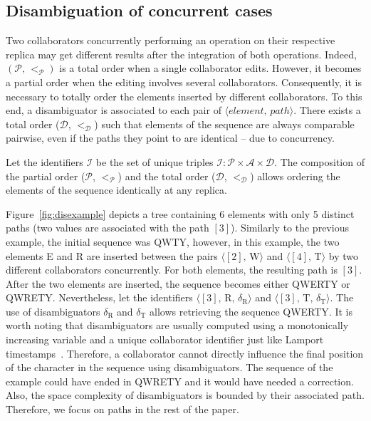 \subsection{Disambiguation of concurrent cases}
\label{subsec:disambiguation}

Two collaborators concurrently performing an operation on their respective
replica may get different results after the integration of both
operations. Indeed, $(\mathcal{P},\,<_\mathcal{P})$ is a total order when a
single collaborator edits. However, it becomes a partial order when the editing
involves several collaborators. Consequently, it is necessary to totally order
the elements inserted by different collaborators. To this end, a disambiguator
is associated to each pair of $\langle element,\,path\rangle$.  There exists a
total order ($\mathcal{D}$, $<_{\mathcal{D}}$) such that elements of the
sequence are always comparable pairwise, even if the paths they point to are
identical -- due to concurrency.

Let the identifiers $\mathcal{I}$ be the set of unique triples
$\mathcal{I}:\mathcal{P}\times \mathcal{A}\times \mathcal{D}$. The composition
of the partial order ($\mathcal{P}$, $<_{\mathcal{P}}$) and the total order
($\mathcal{D}$, $<_{\mathcal{D}}$) allows ordering the elements of the sequence
identically at any replica.

Figure~\ref{fig:disexample} depicts a tree containing 6 elements with only 5
distinct paths (two values are associated with the path $[3]$). Similarly to the
previous example, the initial sequence was QWTY, however, in this example, the
two elements E and R are inserted between the pairs
$\langle [2],\, \text{W}\rangle$ and $\langle [4],\, \text{T}\rangle$ by two
different collaborators concurrently. For both elements, the resulting path is
$[3]$. After the two elements are inserted, the sequence becomes either QWERTY
or QWRETY. Nevertheless, let the identifiers
$\langle [3],\, \text{R},\, \delta_\text{R}\rangle$ and
$\langle [3],\, \text{T},\, \delta_\text{T} \rangle$. The use of disambiguators
$\delta_{\text{R}}$ and $\delta_{\text{T}}$ allows retrieving the sequence
QWERTY. It is worth noting that disambiguators are usually computed using a
monotonically increasing variable and a unique collaborator identifier just like
Lamport timestamps~\cite{lamport1978time}. Therefore, a collaborator cannot
directly influence the final position of the character in the sequence using
disambiguators. The sequence of the example could have ended in QWRETY and it
would have needed a correction. Also, the space complexity of disambiguators is
bounded by their associated path. Therefore, we focus on paths in the rest of
the paper.

